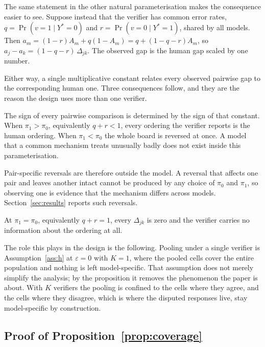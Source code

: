 The same statement in the other natural parameterisation makes the consequence easier to see.
Suppose instead that the verifier has common error rates, $q = \Pr(v = 1 \mid Y^\ast = 0)$ and
$r = \Pr(v = 0 \mid Y^\ast = 1)$, shared by all models. Then
$a_m = (1-r) A_m + q (1 - A_m) = q + (1 - q - r) A_m$, so
$a_j - a_k = (1 - q - r)\,\Delta_{jk}$. The observed gap is the human gap scaled by one
number.

Either way, a single multiplicative constant relates every observed pairwise gap to the
corresponding human one. Three consequences follow, and they are the reason the design uses
more than one verifier.

The sign of every pairwise comparison is determined by the sign of that constant. When
$\pi_1 > \pi_0$, equivalently $q + r < 1$, every ordering the verifier reports is the human
ordering. When $\pi_1 < \pi_0$ the whole board is reversed at once. A model that a common
mechanism treats unusually badly does not exist inside this parameterisation.

Pair-specific reversals are therefore outside the model. A reversal that affects one pair and
leaves another intact cannot be produced by any choice of $\pi_0$ and $\pi_1$, so observing
one is evidence that the mechanism differs across models. Section~\ref{sec:results} reports
such reversals.

At $\pi_1 = \pi_0$, equivalently $q + r = 1$, every $\Delta_{jk}$ is zero and the verifier
carries no information about the ordering at all.

The role this plays in the design is the following. Pooling under a single verifier is
Assumption~\ref{ass:h} at $\varepsilon = 0$ with $K = 1$, where the pooled cells cover the
entire population and nothing is left model-specific. That assumption does not merely
simplify the analysis; by the proposition it removes the phenomenon the paper is about. With
$K$ verifiers the pooling is confined to the cells where they agree, and the cells where they
disagree, which is where the disputed responses live, stay model-specific by construction.

\subsection{Proof of Proposition~\ref{prop:coverage}}

